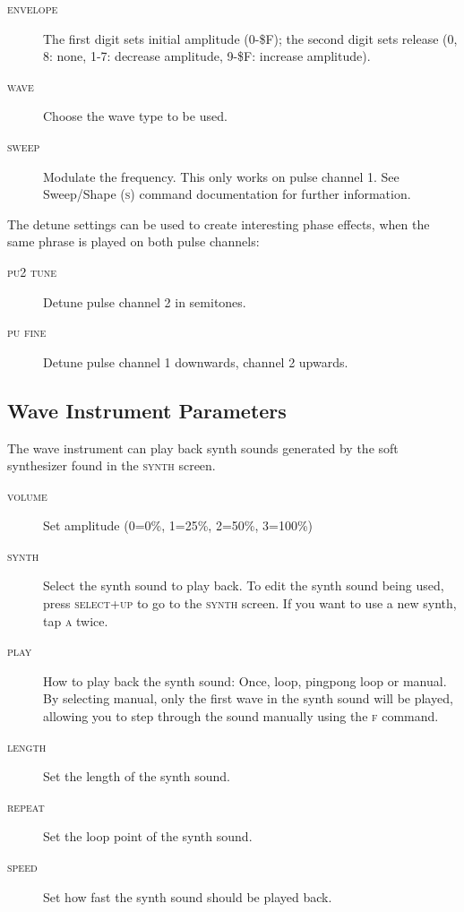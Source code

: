 \begin{description}
	\item[\textsc{envelope}] The first digit sets initial amplitude (0-\$F); the second digit sets release (0, 8: none, 1-7: decrease amplitude, 9-\$F: increase amplitude).
	\item[\textsc{wave}] Choose the wave type to be used.
	\item[\textsc{sweep}] Modulate the frequency. This only works on pulse channel 1. See Sweep/Shape (\textsc{s}) command documentation for further information.
\end{description}

\label{detune}
The detune settings can be used to create interesting phase effects, when the same phrase is played on both pulse channels:

\begin{description}
	\item[\textsc{pu2 tune}] Detune pulse channel 2 in semitones.
	\item[\textsc{pu fine}] Detune pulse channel 1 downwards, channel 2 upwards.
\end{description}

\subsection{Wave Instrument Parameters}

The wave instrument can play back synth sounds generated by the soft synthesizer found in the \textsc{synth} screen.

\begin{figure}[hbtp]
	\begin{center}
	\end{center}
\end{figure}

\begin{description}
	\item[\textsc{volume}] Set amplitude (0=0\%, 1=25\%, 2=50\%, 3=100\%)
	\item[\textsc{synth}] Select the synth sound to play back. To edit the synth sound being used, press \textsc{select+up} to go to the \textsc{synth} screen. If you want to use a new synth, tap \textsc{a} twice.
	\item[\textsc{play}] How to play back the synth sound: Once, loop, pingpong loop or manual. By selecting manual, only the first wave in the synth sound will be played, allowing you to step through the sound manually using the \textsc{f} command.
	\item[\textsc{length}] Set the length of the synth sound.
	\item[\textsc{repeat}] Set the loop point of the synth sound.
	\item[\textsc{speed}] Set how fast the synth sound should be played back.
\end{description}

